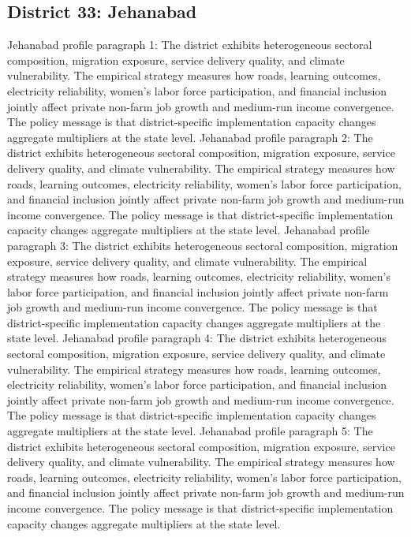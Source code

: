 \documentclass[preprint,12pt]{elsarticle}
\begin{document}
\subsection{District 33: Jehanabad}
Jehanabad profile paragraph 1: The district exhibits heterogeneous sectoral composition, migration exposure, service delivery quality, and climate vulnerability. The empirical strategy measures how roads, learning outcomes, electricity reliability, women's labor force participation, and financial inclusion jointly affect private non-farm job growth and medium-run income convergence. The policy message is that district-specific implementation capacity changes aggregate multipliers at the state level.
Jehanabad profile paragraph 2: The district exhibits heterogeneous sectoral composition, migration exposure, service delivery quality, and climate vulnerability. The empirical strategy measures how roads, learning outcomes, electricity reliability, women's labor force participation, and financial inclusion jointly affect private non-farm job growth and medium-run income convergence. The policy message is that district-specific implementation capacity changes aggregate multipliers at the state level.
Jehanabad profile paragraph 3: The district exhibits heterogeneous sectoral composition, migration exposure, service delivery quality, and climate vulnerability. The empirical strategy measures how roads, learning outcomes, electricity reliability, women's labor force participation, and financial inclusion jointly affect private non-farm job growth and medium-run income convergence. The policy message is that district-specific implementation capacity changes aggregate multipliers at the state level.
Jehanabad profile paragraph 4: The district exhibits heterogeneous sectoral composition, migration exposure, service delivery quality, and climate vulnerability. The empirical strategy measures how roads, learning outcomes, electricity reliability, women's labor force participation, and financial inclusion jointly affect private non-farm job growth and medium-run income convergence. The policy message is that district-specific implementation capacity changes aggregate multipliers at the state level.
Jehanabad profile paragraph 5: The district exhibits heterogeneous sectoral composition, migration exposure, service delivery quality, and climate vulnerability. The empirical strategy measures how roads, learning outcomes, electricity reliability, women's labor force participation, and financial inclusion jointly affect private non-farm job growth and medium-run income convergence. The policy message is that district-specific implementation capacity changes aggregate multipliers at the state level.
\end{document}
